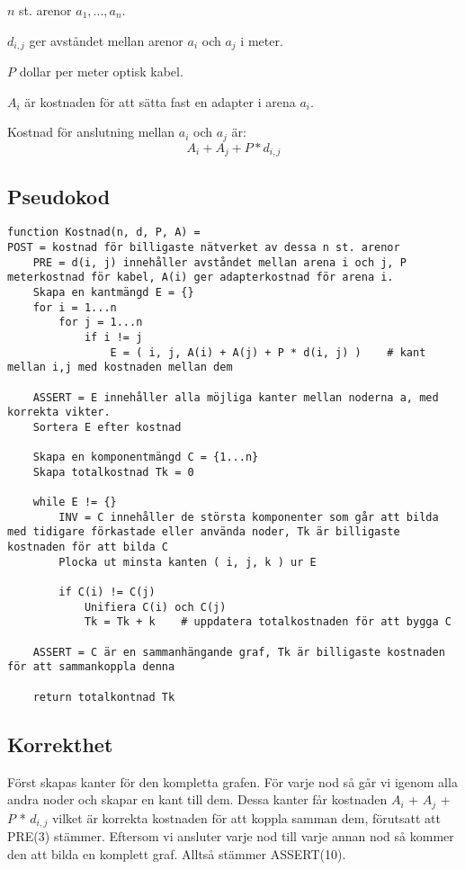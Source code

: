 \documentclass[a4paper,10pt,twoside]{article}
\begin{document}
$n$ st. arenor $a_1,...,a_n$.

$d_{i,j}$ ger avståndet mellan arenor $a_i$ och $a_j$ i meter.

$P$ dollar per meter optisk kabel.

$A_i$ är kostnaden för att sätta fast en adapter i arena $a_i$.

Kostnad för anslutning mellan $a_i$ och $a_j$ är: $$A_i+A_j+P*d_{i,j}$$

\subsection{Pseudokod}

\begin{lstlisting}
function Kostnad(n, d, P, A) =
POST = kostnad för billigaste nätverket av dessa n st. arenor
	PRE = d(i, j) innehåller avståndet mellan arena i och j, P meterkostnad för kabel, A(i) ger adapterkostnad för arena i.
	Skapa en kantmängd E = {}
	for i = 1...n
		for j = 1...n
			if i != j
				E = ( i, j, A(i) + A(j) + P * d(i, j) )    # kant mellan i,j med kostnaden mellan dem

	ASSERT = E innehåller alla möjliga kanter mellan noderna a, med korrekta vikter.
	Sortera E efter kostnad

	Skapa en komponentmängd C = {1...n}
	Skapa totalkostnad Tk = 0

	while E != {}
		INV = C innehåller de största komponenter som går att bilda med tidigare förkastade eller använda noder, Tk är billigaste kostnaden för att bilda C
		Plocka ut minsta kanten ( i, j, k ) ur E

		if C(i) != C(j)
			Unifiera C(i) och C(j)
			Tk = Tk + k    # uppdatera totalkostnaden för att bygga C

	ASSERT = C är en sammanhängande graf, Tk är billigaste kostnaden för att sammankoppla denna

	return totalkontnad Tk
\end{lstlisting}

\subsection{Korrekthet}

Först skapas kanter för den kompletta grafen. För varje nod så går vi igenom alla andra noder och skapar en kant till dem. Dessa kanter får kostnaden $A_i$ + $A_j$ + $P$ * $d_{i,j}$ vilket är korrekta kostnaden för att koppla samman dem, förutsatt att PRE(3) stämmer. Eftersom vi ansluter varje nod till varje annan nod så kommer den att bilda en komplett graf. Alltså stämmer ASSERT(10).
\end{document}
